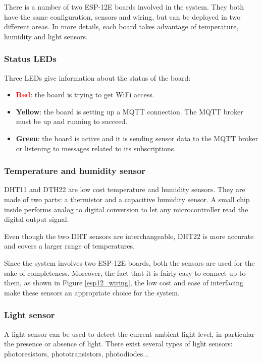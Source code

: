 \noindent
There is a number of two ESP-12E boards involved in the system. They both have the same configuration, sensors and wiring, but can be deployed in two different areas.
In more details, each board takes advantage of temperature, humidity and light sensors.

\subsubsection{Status LEDs}
Three LEDs give information about the status of the board:

\begin{itemize}
	\item \textbf{\textcolor{red}{Red}}: the board is trying to get WiFi access.
	\item \textbf{\textcolor[rgb]{1,0.8,0}{Yellow}}: the board is setting up a MQTT connection. The MQTT broker must be up and running to succeed.
	\item \textbf{\textcolor[rgb]{0,0.6,0}{Green}}: the board is active and it is sending sensor data to the MQTT broker or listening to messages related to its subscriptions.
\end{itemize}

\subsubsection{Temperature and humidity sensor}
DHT11 and DTH22 are low cost temperature and humidity sensors. They are made of two parts: a thermistor and a capacitive humidity sensor. A small chip inside performs analog to digital conversion to let any microcontroller read the digital output signal.

Even though the two DHT sensors are interchangeable, DHT22 is more accurate and covers a larger range of temperatures.

Since the system involves two ESP-12E boards, both the sensors are used for the sake of completeness. Moreover, the fact that it is fairly easy to connect up to them, as shown in Figure \ref{esp12_wiring}, the low cost and ease of interfacing make these sensors an appropriate choice for the system.

\subsubsection{Light sensor}
A light sensor can be used to detect the current ambient light level, in particular the presence or absence of light. There exist several types of light sensors: photoresistors, phototransistors, photodiodes...


